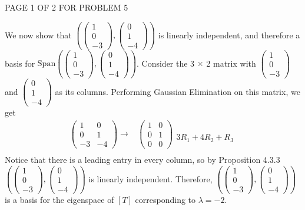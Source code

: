 \documentclass[12pt]{article}
\newenvironment{problem}[2][Problem]
{
	\begin{trivlist} 
		\item[\hskip \labelsep {\bfseries #1 #2:}]
	}
{
	\end{trivlist}
	}
\newenvironment{solution}[1][Solution]
{
	\begin{trivlist} 
		\item[\hskip \labelsep {\itshape #1:}]
	}
	{
	\end{trivlist}
}
\begin{document}
\begin{problem}{5}
\begin{solution}
\vfill
\centerline{PAGE 1 OF 2 FOR PROBLEM 5}
%
\newpage
\noindent
We now show that $\left( \begin{pmatrix}1\\0\\-3\end{pmatrix}, \begin{pmatrix} 0\\1\\-4\end{pmatrix} \right)$ is linearly independent, and therefore a basis for $\text{Span}\left( \begin{pmatrix}1\\0\\-3\end{pmatrix}, \begin{pmatrix} 0\\1\\-4\end{pmatrix} \right)$. Consider the 3 $\times$ 2 matrix with $\begin{pmatrix}1\\0\\-3\end{pmatrix}$ and $\begin{pmatrix} 0\\1\\-4\end{pmatrix}$ as its columns. Performing Gaussian Elimination on this matrix, we get
\begin{align*}
\begin{pmatrix}1&0\\0&1\\-3&-4 \end{pmatrix} \rightarrow & \begin{pmatrix}1&0\\0&1\\0&0 \end{pmatrix} \begin{matrix} \text{} \\ \text{} \\ 3R_1+4R_2+R_3 \text{} \end{matrix}\\
\end{align*}
Notice that there is a leading entry in every column, so by Proposition 4.3.3 $\left( \begin{pmatrix}1\\0\\-3\end{pmatrix}, \begin{pmatrix} 0\\1\\-4\end{pmatrix} \right)$ is linearly independent. Therefore, $\left( \begin{pmatrix}1\\0\\-3\end{pmatrix}, \begin{pmatrix} 0\\1\\-4\end{pmatrix} \right)$ is a basis for the eigenspace of $[T]$ corresponding to $\lambda=-2$.

\end{solution}
\end{problem}
\end{document}
